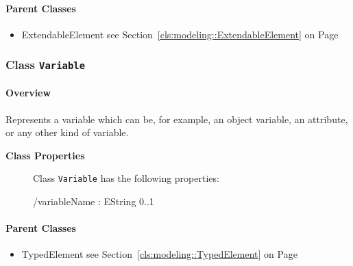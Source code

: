 	



\paragraph{Parent Classes}
\begin{itemize}
\item ExtendableElement see Section~\ref{cls:modeling::ExtendableElement} on Page~\pageref{cls:modeling::ExtendableElement}\end{itemize}
\subsubsection{\Large{Class \bfseries \texttt{Variable}\normalfont}}
\label{cls:modeling::Variable} 
\paragraph{Overview}

	
			
Represents a variable which can be, for example, an object variable, an attribute, or any other kind of variable.	
		
	


\begin{description}

	\item[\textbf{Class Properties}] Class \texttt{Variable} has the following properties:
	\begin{description}
\item[/variableName : EString 			0..1]
\hspace{\fill}
\nopagebreak


	
	\end{description}
	
	

\end{description}

\paragraph{Parent Classes}
\begin{itemize}
\item TypedElement see Section~\ref{cls:modeling::TypedElement} on Page~\pageref{cls:modeling::TypedElement}\end{itemize}
\newpage
		


